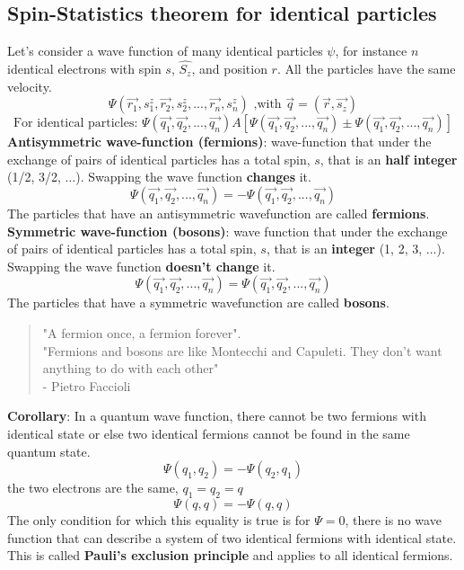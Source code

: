 \subsection{Spin-Statistics theorem for identical particles}
Let's consider a wave function of many identical particles $\psi$, for instance $n$ identical electrons with spin $s$, $\hat{S_z}$, and position $r$. All the particles have the same velocity.\\
\[
\Psi(\vec{r_1}, s_1^z, \vec{r_2}, s_2^z, ..., \vec{r_n}, s_n^z) \text{   ,with } \vec{q}=(\vec{r},\vec{s_z})
\]
\[\text{For identical particles: }\Psi(\vec{q_1},\vec{q_2}, ..., \vec{q_n})A[\Psi(\vec{q_1},\vec{q_2}, ..., \vec{q_n})\pm\Psi(\vec{q_1},\vec{q_2}, ..., \vec{q_n})] \]
\textbf{Antisymmetric wave-function (fermions)}: wave-function that under the exchange of pairs of identical particles has a total spin, $s$, that is an \textbf{half integer} (1/2, 3/2, ...). Swapping the wave function \textbf{changes} it.\\
\[\Psi(\vec{q_1},\vec{q_2}, ..., \vec{q_n})=-\Psi(\vec{q_1},\vec{q_2}, ..., \vec{q_n})\]
The particles that have an antisymmetric wavefunction are called \textbf{fermions}.\\
\newline
\textbf{Symmetric wave-function (bosons)}: wave function that under the exchange of pairs of identical particles has a total spin, $s$, that is an \textbf{integer} (1, 2, 3, ...). Swapping the wave function \textbf{doesn't change} it.\\
\[\Psi(\vec{q_1},\vec{q_2}, ..., \vec{q_n})=\Psi(\vec{q_1},\vec{q_2}, ..., \vec{q_n})\]
The particles that have a symmetric wavefunction are called \textbf{bosons}.
\begin{quote}
	"A fermion once, a fermion forever".\\
	"Fermions and bosons are like Montecchi and Capuleti. They don't want anything to do with each other"\\
	- Pietro Faccioli
\end{quote}
\noindent
\textbf{Corollary}: In a quantum wave function, there cannot be two fermions with identical state or else two identical fermions cannot be found in the same quantum state.
\[\Psi(q_1, q_2)= -\Psi(q_2,q_1)\] the two electrons are the same, $q_1=q_2=q$
\[\Psi(q,q)=-\Psi(q,q) \]
The only condition for which this equality is true is for  $\Psi = 0$, there is no wave function that can describe a system of two identical fermions with identical state. This is called \textbf{Pauli's exclusion principle} and applies to all identical fermions.
\\
